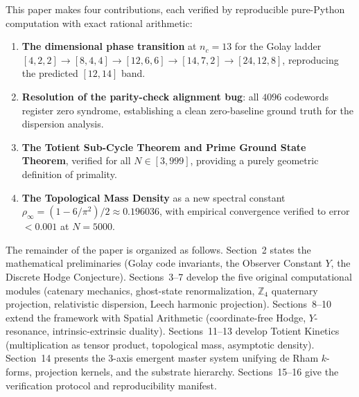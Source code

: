 \documentclass[11pt,a4paper]{article}
\begin{document}
This paper makes four contributions, each verified by reproducible
pure-Python computation with exact rational arithmetic:

\begin{enumerate}[label=(\arabic*),leftmargin=*]
\item \textbf{The dimensional phase transition} at $n_c = 13$ for the
Golay ladder $[4,2,2] \to [8,4,4] \to [12,6,6] \to [14,7,2] \to
[24,12,8]$, reproducing the predicted $[12,14]$ band.

\item \textbf{Resolution of the parity-check alignment bug}: all $4096$
codewords register zero syndrome, establishing a clean zero-baseline
ground truth for the dispersion analysis.

\item \textbf{The Totient Sub-Cycle Theorem and Prime Ground State
Theorem}, verified for all $N \in [3, 999]$, providing a purely
geometric definition of primality.

\item \textbf{The Topological Mass Density} as a new spectral constant
$\rho_\infty = (1 - 6/\pi^2)/2 \approx 0.196036$, with empirical
convergence verified to error $< 0.001$ at $N = 5000$.
\end{enumerate}

The remainder of the paper is organized as follows.
Section~2 states the mathematical preliminaries (Golay code invariants,
the Observer Constant $Y$, the Discrete Hodge Conjecture).
Sections~3--7 develop the five original computational modules (catenary
mechanics, ghost-state renormalization, $\mathbb{Z}_4$ quaternary
projection, relativistic dispersion, Leech harmonic projection).
Sections~8--10 extend the framework with Spatial Arithmetic
(coordinate-free Hodge, $Y$-resonance, intrinsic-extrinsic duality).
Sections~11--13 develop Totient Kinetics (multiplication as tensor
product, topological mass, asymptotic density). Section~14 presents
the 3-axis emergent master system unifying de Rham $k$-forms, projection
kernels, and the substrate hierarchy. Sections~15--16 give the
verification protocol and reproducibility manifest.
\end{document}
